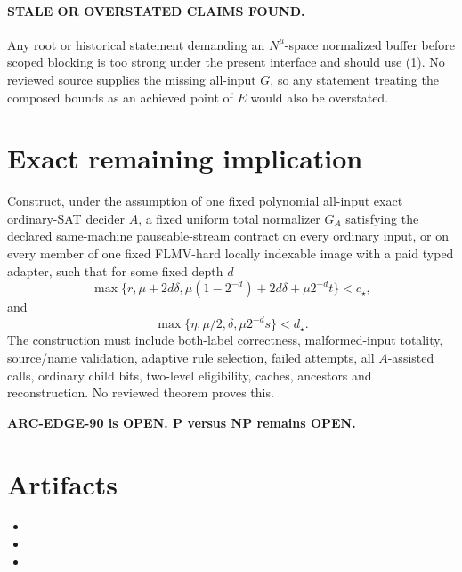 \documentclass[11pt]{article}
\begin{document}
\paragraph{STALE OR OVERSTATED CLAIMS FOUND.}
Any root or historical statement demanding an \(N^{\mu}\)-space normalized
buffer before scoped blocking is too strong under the present interface and
should use (1).  No reviewed source supplies the missing all-input \(G\), so
any statement treating the composed bounds as an achieved point of \(E\)
would also be overstated.

\section{Exact remaining implication}
Construct, under the assumption of one fixed polynomial all-input exact
ordinary-SAT decider \(A\), a fixed uniform total normalizer \(G_A\) satisfying
the declared same-machine pauseable-stream contract on every ordinary input,
or on every member of one fixed FLMV-hard locally indexable image with a paid
typed adapter, such that for some fixed depth \(d\)
\[
\max\{r,\mu+2d\delta,
\mu(1-2^{-d})+2d\delta+\mu 2^{-d}t\}<c_\star,
\]
and
\[
\max\{\eta,\mu/2,\delta,\mu2^{-d}s\}<d_\star.
\]
The construction must include both-label correctness, malformed-input
totality, source/name validation, adaptive rule selection, failed attempts,
all \(A\)-assisted calls, ordinary child bits, two-level eligibility, caches,
ancestors and reconstruction.  No reviewed theorem proves this.

\textbf{ARC-EDGE-90 is OPEN.  P versus NP remains OPEN.}

\section*{Artifacts}
\begin{itemize}
\item {}
\item {}
\item {}
\end{itemize}
\end{document}
